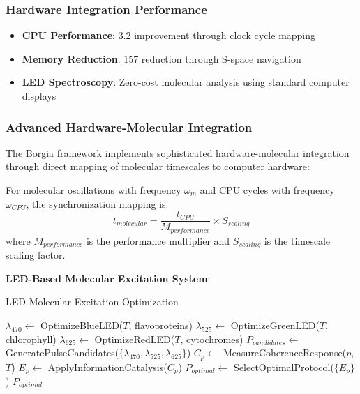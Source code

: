 ﻿\documentclass[11pt,a4paper]{article}
\begin{document}
\subsubsection{Hardware Integration Performance}
\begin{itemize}
\item \textbf{CPU Performance}: 3.2 \times improvement through clock cycle mapping
\item \textbf{Memory Reduction}: 157 \times reduction through S-space navigation
\item \textbf{LED Spectroscopy}: Zero-cost molecular analysis using standard computer displays
\end{itemize}

\subsubsection{Advanced Hardware-Molecular Integration}

The Borgia framework implements sophisticated hardware-molecular integration through direct mapping of molecular timescales to computer hardware:

\begin{definition}
For molecular oscillations with frequency $\omega_m$ and CPU cycles with frequency $\omega_{CPU}$, the synchronization mapping is:
\begin{equation}
t_{molecular} = \frac{t_{CPU}}{M_{performance}} \times S_{scaling}
\end{equation}
where $M_{performance}$ is the performance multiplier and $S_{scaling}$ is the timescale scaling factor.
\end{definition}

\textbf{LED-Based Molecular Excitation System}:

\begin{algorithm}
\caption{LED-Molecular Excitation Optimization}
\begin{algorithmic}
    \State $\lambda_{470} \leftarrow$ OptimizeBlueLED($T$, flavoproteins)
    \State $\lambda_{525} \leftarrow$ OptimizeGreenLED($T$, chlorophyll)
    \State $\lambda_{625} \leftarrow$ OptimizeRedLED($T$, cytochromes)
    \State $P_{candidates} \leftarrow$ GeneratePulseCandidates($\{\lambda_{470}, \lambda_{525}, \lambda_{625}\}$)
        \State $C_p \leftarrow$ MeasureCoherenceResponse($p$, $T$)
        \State $E_p \leftarrow$ ApplyInformationCatalysis($C_p$)
    \EndFor
    \State $P_{optimal} \leftarrow$ SelectOptimalProtocol($\{E_p\}$)
    \State \Return $P_{optimal}$
\EndProcedure
\end{algorithmic}
\end{algorithm}
\end{document}

